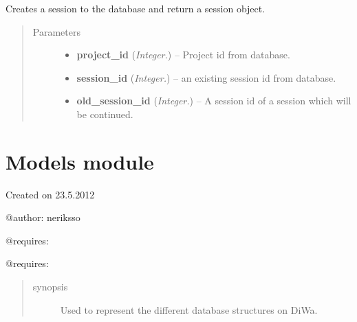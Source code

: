 \documentclass[letterpaper,10pt,english]{sphinxmanual}
\begin{document}

\begin{fulllineitems}
\label{api:controller.StartNewSession}
Creates a session to the database and return a session object.
\begin{quote}\begin{description}
\item[{Parameters}] \leavevmode\begin{itemize}
\item {} 
\textbf{project\_id} (\emph{Integer.}) -- Project id from database.

\item {} 
\textbf{session\_id} (\emph{Integer.}) -- an existing session id from database.

\item {} 
\textbf{old\_session\_id} (\emph{Integer.}) -- A session id of a session which will be continued.

\end{itemize}

\end{description}\end{quote}

\end{fulllineitems}



\section{Models module}
\label{api:module-models}\label{api:models-module}
Created on 23.5.2012

@author: neriksso

@requires: 

@requires: 
\begin{quote}\begin{description}
\item[{synopsis}] \leavevmode
Used to represent the different database structures on DiWa.

\end{description}\end{quote}
\end{document}
